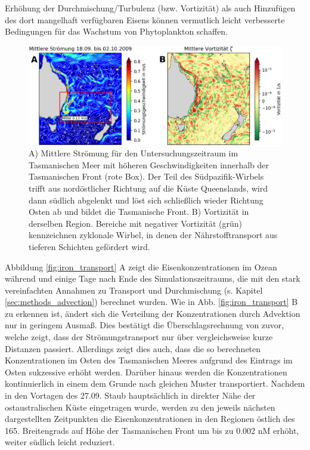 \documentclass[12pt,a4paper,onecolumn]{scrartcl}
\begin{document}
Erhöhung der Durchmischung/Turbulenz (bzw. Vortizität) als auch Hinzufügen des dort mangelhaft verfügbaren Eisens können vermutlich leicht verbesserte Bedingungen für das Wachstum von Phytoplankton schaffen.
\begin{figure}[!htb]
\includegraphics[width=\textwidth]{bilder/currents_mean.png}
\caption{A) Mittlere Strömung für den Untersuchungszeitraum im Tasmanischen Meer mit höheren Geschwindigkeiten innerhalb der Tasmanischen Front (rote Box). Der Teil des Südpazifik-Wirbels trifft aus nordöstlicher Richtung auf die Küste Queenslands, wird dann südlich abgelenkt und löst sich schließlich wieder Richtung Osten ab und bildet die Tasmanische Front. B) Vortizität in derselben Region. Bereiche mit negativer Vortizität (grün) kennzeichnen zyklonale Wirbel, in denen der Nährstofftransport aus tieferen Schichten gefördert wird. } \label{fig:tasman_current}
\end{figure}
Abbildung \ref{fig:iron_transport} A zeigt die Eisenkonzentrationen im Ozean während und einige Tage nach Ende des Simulationszeitraums, die mit den stark vereinfachten Annahmen zu Transport und Durchmischung (s. Kapitel \ref{sec:methods_advection}) berechnet wurden. Wie in Abb. \ref{fig:iron_transport} B zu erkennen ist, ändert sich die Verteilung der Konzentrationen durch Advektion nur in geringem Ausmaß. Dies bestätigt die Überschlagsrechnung von zuvor, welche zeigt, dass der Strömungstransport nur über vergleichsweise kurze Distanzen passiert. Allerdings zeigt dies auch, dass die so berechneten Konzentrationen im Osten des Tasmanischen Meeres aufgrund des Eintrags im Osten sukzessive erhöht werden. Darüber hinaus werden die Konzentrationen kontinuierlich in einem dem Grunde nach gleichen Muster transportiert. Nachdem in den Vortagen des 27.09. Staub hauptsächlich in direkter Nähe der ostaustralischen Küste eingetragen wurde, werden zu den jeweils nächsten dargestellten Zeitpunkten die Eisenkonzentrationen in den Regionen östlich des 165. Breitengrads auf Höhe der Tasmanischen Front um bis zu 0.002 nM erhöht, weiter südlich leicht reduziert.
\end{document}
